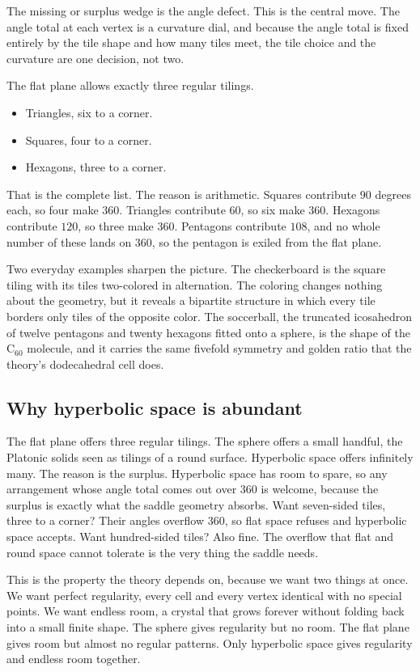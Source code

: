 The missing or surplus wedge is the angle defect. This is the central move. The angle total at each vertex
is a curvature dial, and because the angle total is fixed entirely by the tile shape and how many tiles
meet, the tile choice and the curvature are one decision, not two.

The flat plane allows exactly three regular tilings.
\begin{itemize}
\item Triangles, six to a corner.
\item Squares, four to a corner.
\item Hexagons, three to a corner.
\end{itemize}
That is the complete list. The reason is arithmetic. Squares contribute $90$ degrees each, so four make
$360$. Triangles contribute $60$, so six make $360$. Hexagons contribute $120$, so three make $360$.
Pentagons contribute $108$, and no whole number of these lands on $360$, so the pentagon is exiled from the
flat plane.

Two everyday examples sharpen the picture. The checkerboard is the square tiling with its tiles two-colored
in alternation. The coloring changes nothing about the geometry, but it reveals a bipartite structure in
which every tile borders only tiles of the opposite color. The soccerball, the truncated icosahedron of
twelve pentagons and twenty hexagons fitted onto a sphere, is the shape of the $\mathrm{C}_{60}$ molecule,
and it carries the same fivefold symmetry and golden ratio that the theory's dodecahedral cell does.

\subsection{Why hyperbolic space is abundant}

The flat plane offers three regular tilings. The sphere offers a small handful, the Platonic solids seen as
tilings of a round surface. Hyperbolic space offers infinitely many. The reason is the surplus. Hyperbolic
space has room to spare, so any arrangement whose angle total comes out over $360$ is welcome, because the
surplus is exactly what the saddle geometry absorbs. Want seven-sided tiles, three to a corner? Their angles
overflow $360$, so flat space refuses and hyperbolic space accepts. Want hundred-sided tiles? Also fine. The
overflow that flat and round space cannot tolerate is the very thing the saddle needs.

This is the property the theory depends on, because we want two things at once. We want perfect regularity,
every cell and every vertex identical with no special points. We want endless room, a crystal that grows
forever without folding back into a small finite shape. The sphere gives regularity but no room. The flat
plane gives room but almost no regular patterns. Only hyperbolic space gives regularity and endless room
together.

